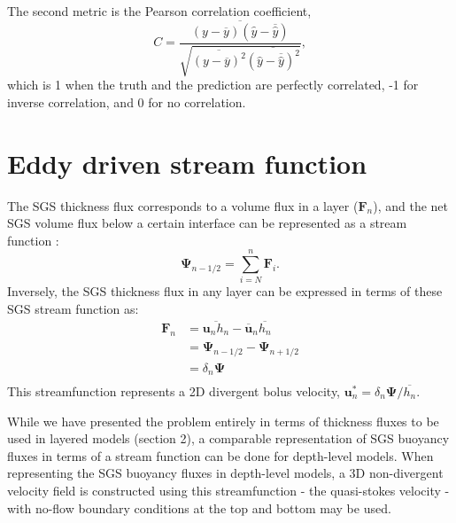 \documentclass[draft]{agujournal2019}
\begin{document}
The second metric is the Pearson correlation coefficient, 
\begin{equation}
    C = \frac{\overline{(y - \overline{y})(\hat{y} - \overline{\hat{y}})}}{\sqrt{\overline{(y - \overline{y})^2}\overline{(\hat{y} - \overline{\hat{y}})^2}}},
\end{equation}
which is 1 when the truth and the prediction are perfectly correlated, -1 for inverse correlation, and 0 for no correlation.




\section{Eddy driven stream function}
\label{app:eddy_streamfn}

The SGS thickness flux corresponds to a volume flux in a layer ($\mathbf{F}_n$), and the net SGS volume flux below a certain interface can be represented as a stream function \cite{mcdougall2001temporal}: 
\begin{equation}
    \mathbf{\Psi}_{n-1/2} = \sum_{i=N}^n \mathbf{F}_i. %
\end{equation}
Inversely, the SGS thickness flux in any layer can be expressed in terms of these SGS stream function as:
\begin{align}
    \mathbf{F}_n & =  \overline{\mathbf{u}_n h_n} -  \overline{\mathbf{u}}_n \overline{h_n} \\
    & = \mathbf{\Psi}_{n-1/2} - \mathbf{\Psi}_{n+1/2} \\
    &  = \delta_n \mathbf{\Psi} \\ 
\end{align}
This streamfunction represents a 2D divergent bolus velocity, $\mathbf{u}_n^* = \delta_n \mathbf{\Psi}/\overline{h_n}$.

While we have presented the problem entirely in terms of thickness fluxes to be used in layered models (section 2), a comparable representation of SGS buoyancy fluxes in terms of a stream function can be done for depth-level models. When representing the SGS buoyancy fluxes in depth-level models, a 3D non-divergent velocity field is constructed using this streamfunction - the quasi-stokes velocity - with no-flow boundary conditions at the top and bottom may be used.  
\end{document}
